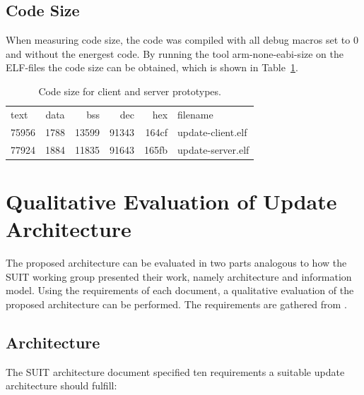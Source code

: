 \documentclass[0-thesis.tex]{subfiles}
\begin{document}
\subsection{Code Size}
\label{ssec:code-size}
When measuring code size, the code was compiled with all debug macros set to 0 and without
the energest code. By running the tool arm-none-eabi-size on the ELF-files the code size
can be obtained, which is shown in Table~\ref{tab:code-size}.

\begin{table}
\begin{tabular}{l c r r r l}
text	&  data	 &  bss	 &  dec	 &  hex&filename\\
75956	&  1788	 &13599	 &91343	 &164cf&update-client.elf\\
77924	&  1884	 &11835	 &91643	 &165fb&update-server.elf
\end{tabular}
\caption{Code size for client and server prototypes.}
\label{tab:code-size}
\end{table}

\section{Qualitative Evaluation of Update Architecture}
\label{sec:qual-evaluation}
The proposed architecture can be evaluated in two parts analogous to how the SUIT working
group presented their work, namely architecture and information model. Using the
requirements of each document, a qualitative evaluation of the proposed architecture can
be performed. The requirements are gathered from \parencite{suit-architecture,
suit-information-model}.
\subsection{Architecture}
\label{ssec:arch-evaluation}
The SUIT architecture document specified ten requirements a suitable update architecture
should fulfill:
\end{document}
